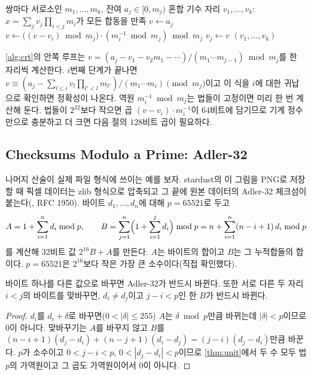 \begin{algorithm}[htbp]
\begin{algorithmic}[1]
\Require 쌍마다 서로소인 $m_1,\dots,m_k$, 잔여 $a_j\in[0,m_j)$
\Ensure 혼합 기수 자리 $v_1,\dots,v_k$: $x=\sum_jv_j\prod_{i<j}m_i$가 모든 합동을 만족
  \State $v\gets a_j$
   
    \State $v\gets\bigl((v-v_i)\bmod m_j\bigr)\cdot(m_i^{-1}\bmod m_j)\bmod m_j$
  \EndFor
  \State $v_j\gets v$
\EndFor
\State \Return $(v_1,\dots,v_k)$
\end{algorithmic}
\caption{Garner의 중국인의 나머지 재구성}
\label{alg:crt}
\end{algorithm}

\cref{alg:crt}의 안쪽 루프는 $v=(a_j-v_1-v_2m_1-\cdots)/(m_1\cdots m_{j-1})\bmod m_j$를 한 자리씩 계산한다. $i$번째 단계가 끝나면 $v\equiv(a_j-\sum_{l\le i}v_l\prod_{l'<l}m_{l'})/(m_1\cdots m_i)\pmod{m_j}$이고 이 식을 $i$에 대한 귀납으로 확인하면 정확성이 나온다. 역원 $m_i^{-1}\bmod m_j$는 법들이 고정이면 미리 한 번 계산해 둔다. 법들이 $2^{32}$보다 작으면 곱 $(v-v_i)\cdot m_i^{-1}$이 $64$비트에 담기므로 기계 정수만으로 충분하고 더 크면 다음 절의 $128$비트 곱이 필요하다.

\subsection{Checksums Modulo a Prime: Adler-32}

나머지 산술이 실제 파일 형식에 쓰이는 예를 보자. stardust의 이 그림을 PNG로 저장할 때 픽셀 데이터는 zlib 형식으로 압축되고 그 끝에 원본 데이터의 Adler-32 체크섬이 붙는다(, RFC 1950\cite{rfc1950}). 바이트 $d_1,\dots,d_n$에 대해 $p=65521$로 두고
\[
A=1+\sum_{i=1}^nd_i\bmod p,\qquad B=\sum_{j=1}^n\Bigl(1+\sum_{i=1}^jd_i\Bigr)\bmod p=n+\sum_{i=1}^n(n-i+1)\,d_i\bmod p
\]
를 계산해 $32$비트 값 $2^{16}B+A$를 만든다. $A$는 바이트의 합이고 $B$는 그 누적합들의 합이다. $p=65521$은 $2^{16}$보다 작은 가장 큰 소수이다(직접 확인했다).

\begin{proposition}
\label{prop:adler-detect}
바이트 하나를 다른 값으로 바꾸면 Adler-32가 반드시 바뀐다. 또한 서로 다른 두 자리 $i<j$의 바이트를 맞바꾸면, $d_i\neq d_j$이고 $j-i<p$인 한 $B$가 반드시 바뀐다.
\end{proposition}

\begin{proof}
$d_i$를 $d_i+\delta$로 바꾸면($0<|\delta|\le255$) $A$는 $\delta\bmod p$만큼 바뀌는데 $|\delta|<p$이므로 $0$이 아니다. 맞바꾸기는 $A$를 바꾸지 않고 $B$를 $(n-i+1)(d_j-d_i)+(n-j+1)(d_i-d_j)=(j-i)(d_j-d_i)$만큼 바꾼다. $p$가 소수이고 $0<j-i<p$, $0<|d_j-d_i|<p$이므로 \cref{thm:unit}에서 두 수 모두 법 $p$의 가역원이고 그 곱도 가역원이어서 $0$이 아니다.
\end{proof}

